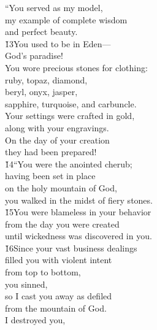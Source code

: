 \begin{poetry}
\poeml ``You served as my model, \\
\poemll    my example of complete wisdom \\
\poemlll       and perfect beauty. \\
\poeml \v{13}You used to be in Eden--- \\
\poemll    God's paradise! \\
\poeml You wore precious stones for clothing: \\
\poeml ruby, topaz, diamond, \\
\poemll    beryl, onyx, jasper, \\
\poemlll       sapphire, turquoise, and carbuncle. \\
\poeml Your settings were crafted in gold, \\
\poemll    along with your engravings. \\
\poeml On the day of your creation \\
\poemll    they had been prepared! \\
\poeml \v{14}``You were the anointed cherub; \\
\poemll    having been set in place \\
\poeml on the holy mountain of God, \\
\poemll    you walked in the midst of fiery stones. \\
\poeml \v{15}You were blameless in your behavior \\
\poemll    from the day you were created \\
\poemlll       until wickedness was discovered in you. \\
\poeml \v{16}Since your vast business dealings \\
\poemll    filled you with violent intent \\
\poeml from top to bottom, \\
\poemll    you sinned, \\
\poeml so I cast you away as defiled \\
\poemll    from the mountain of God. \\
\poeml I destroyed you, \\

\end{poetry}
